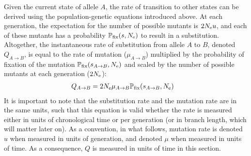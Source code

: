 \begin{table}[H]
    \centering
    \noindent{}
    \caption[Parameters of mutation-selection processes]{Parameter of mutation-selection processes used in this section (\ref{subsec:mutation-limited-assumption})}
    \label{table:params-mutsel}
\end{table}

Given the current state of allele $A$, the rate of transition to other states can be derived using the population-genetic equations introduced above.
At each generation, the expectation for the number of possible mutants is $2N_{\text{e}} u$, and each of these mutants has a probability $\mathbb{P}_{\text{fix}}(s, N_{\text{e}})$ to result in a substitution.
Altogether, the instantaneous rate of substitution from allele $A$ to $B$, denoted $Q_{A \to B}$, is equal to the rate of mutation ($\mu_{A \to B}$) multiplied by the probability of fixation of the mutation $\mathbb{P}_{\text{fix}}(s_{A \to B}, N_{\text{e}})$ and scaled by the number of possible mutants at each generation ($2N_{\text{e}}$):
\begin{align}
    Q_{A \to B} & = 2 N_{\text{e}} \mu_{A \to B}  \mathbb{P}_{\text{fix}}(s_{A \to B}, N_{\text{e}}) \label{eq:q-pfix}
\end{align}
It is important to note that the substitution rate and the mutation rate are in the same units, such that this equation is valid whether the rate is measured either in units of chronological time or per generation (or in branch length, which will matter later on).
As a convention, in what follows, mutation rate is denoted $u$ when measured in units of generation, and denoted $\mu$ when measured in units of time.
As a consequence, $Q$ is measured in units of time in this section.

